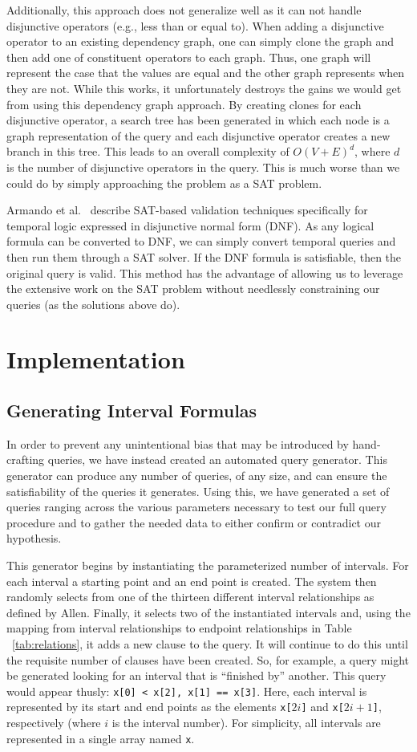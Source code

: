 \documentclass{achemso}
\begin{document}
Additionally, this approach does not generalize well as it can not handle disjunctive operators (e.g., less than or equal to).  When adding a disjunctive operator to an existing dependency graph, one can simply clone the graph and then add one of constituent operators to each graph.  Thus, one graph will represent the case that the values are equal and the other graph represents when they are not.  While this works, it unfortunately destroys the gains we would get from using this dependency graph approach.  By creating clones for each disjunctive operator, a search tree has been generated in which each node is a graph representation of the query and each disjunctive operator creates a new branch in this tree.  This leads to an overall complexity of $O(V + E)^d$, where $d$ is the number of disjunctive operators in the query.  This is much worse than we could do by simply approaching the problem as a SAT problem.

Armando et al.~\cite{Armando:1999} describe SAT-based validation techniques specifically for temporal logic expressed in disjunctive normal form (DNF). As any logical formula can be converted to DNF, we can simply convert temporal queries and then run them through a SAT solver. If the DNF formula is satisfiable, then the original query is valid. This method has the advantage of allowing us to leverage the extensive work on the SAT problem without needlessly constraining our queries (as the solutions above do).  
\section{Implementation}
\subsection{Generating Interval Formulas}
In order to prevent any unintentional bias that may be introduced by hand-crafting queries, we have instead created an automated query generator.  This generator can produce any number of queries, of any size, and can ensure the satisfiability of the queries it generates.  Using this, we have generated a set of queries ranging across the various parameters necessary to test our full query procedure and to gather the needed data to either confirm or contradict our hypothesis.

This generator begins by instantiating the parameterized number of intervals.  For each interval a starting point and an end point is created.  The system then randomly selects from one of the thirteen different interval relationships as defined by Allen.  Finally, it selects two of the instantiated intervals and, using the mapping from interval relationships to endpoint relationships in Table ~\ref{tab:relations}, it adds a new clause to the query.  It will continue to do this until the requisite number of clauses have been created.  So, for example, a query might be generated looking for an interval that is ``finished by'' another.  This query would appear thusly:  \texttt{x[0] < x[2], x[1] == x[3]}.  Here, each interval is represented by its start and end points as the elements \texttt{x[$2i$]} and \texttt{x[$2i+1$]}, respectively (where $i$ is the interval number).  For simplicity, all intervals are represented in a single array named \texttt{x}.
\end{document}
